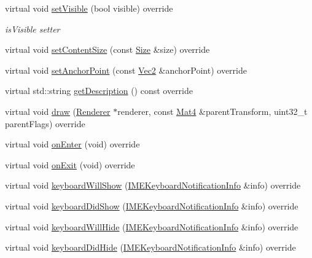 \begin{DoxyCompactItemize}
\item 
virtual void \hyperlink{classui_1_1EditBox_afd90efc8e80090f96e54f39520405883}{set\+Visible} (bool visible) override
\begin{DoxyCompactList}\small\item\em is\+Visible setter \end{DoxyCompactList}\item 
virtual void \hyperlink{classui_1_1EditBox_a1aadf938d146d0469da42e42d33e2a1e}{set\+Content\+Size} (const \hyperlink{classSize}{Size} \&size) override
\item 
virtual void \hyperlink{classui_1_1EditBox_ad17a8fc58f78d77e47106170e6db9f39}{set\+Anchor\+Point} (const \hyperlink{classVec2}{Vec2} \&anchor\+Point) override
\item 
virtual std\+::string \hyperlink{classui_1_1EditBox_a00b9b37d30ef21b95997a016af53e05e}{get\+Description} () const override
\item 
virtual void \hyperlink{classui_1_1EditBox_af89050d6cee47d03c205f34fec481db4}{draw} (\hyperlink{classRenderer}{Renderer} $\ast$renderer, const \hyperlink{classMat4}{Mat4} \&parent\+Transform, uint32\+\_\+t parent\+Flags) override
\item 
virtual void \hyperlink{classui_1_1EditBox_a04667a919ce4f36fefb7605215267b28}{on\+Enter} (void) override
\item 
virtual void \hyperlink{classui_1_1EditBox_a4151e7abfe84c879cc89f683c4975285}{on\+Exit} (void) override
\item 
virtual void \hyperlink{classui_1_1EditBox_abc522ffb60d7bb59404be9584fc1f60c}{keyboard\+Will\+Show} (\hyperlink{structIMEKeyboardNotificationInfo}{I\+M\+E\+Keyboard\+Notification\+Info} \&info) override
\item 
virtual void \hyperlink{classui_1_1EditBox_a88c3e0a04a3857cacfc6cab7850fb8e0}{keyboard\+Did\+Show} (\hyperlink{structIMEKeyboardNotificationInfo}{I\+M\+E\+Keyboard\+Notification\+Info} \&info) override
\item 
virtual void \hyperlink{classui_1_1EditBox_afa54a7e9d06de4524963bf23565e8310}{keyboard\+Will\+Hide} (\hyperlink{structIMEKeyboardNotificationInfo}{I\+M\+E\+Keyboard\+Notification\+Info} \&info) override
\item 
virtual void \hyperlink{classui_1_1EditBox_a54e44ca3b05a55e0498f6471a33a0c74}{keyboard\+Did\+Hide} (\hyperlink{structIMEKeyboardNotificationInfo}{I\+M\+E\+Keyboard\+Notification\+Info} \&info) override
\item 
\mbox{\label{classui_1_1EditBox_aeb746d4293ff9b51a7a589fc732c12f3}} 

\end{DoxyCompactItemize}
